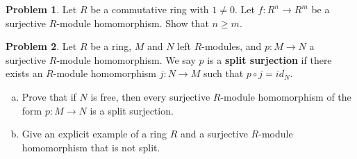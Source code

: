 \documentclass[11pt]{article}
\theoremstyle{definition}
\newtheorem{problem}{Problem}
\begin{document}
\begin{problem}
Let $R$ be a commutative ring with $1 \neq 0$.
Let $f\!: R^n \to R^m$ be a surjective $R$-module homomorphism. Show that $n \geqslant m$.	
\end{problem}

\begin{problem}
Let $R$ be a ring, $M$ and $N$ left $R$-modules, and $p\!: M \to  N$ a surjective $R$-module homomorphism.
We say $p$ is a {\bf split surjection} if there exists an $R$-module homomorphism $j\!: N \to M$ such that $p \circ j = id_N$.
\begin{enumerate}[a)]
\item Prove that if $N$ is free, then every surjective $R$-module homomorphism of the form $p: M \to N$ is a split surjection.
  \item Give an explicit example of a ring $R$ and a surjective $R$-module homomorphism that is not split.
\end{enumerate}
\end{problem}  
\end{document}
